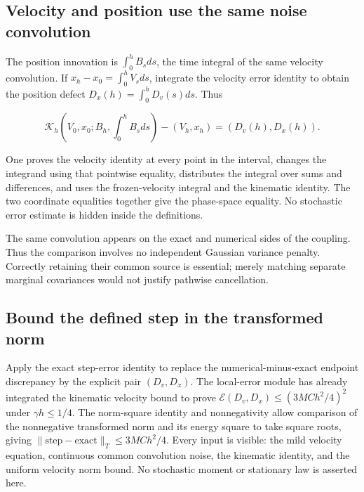 \documentclass[11pt,a4paper]{report}
\begin{document}
\subsection{\texorpdfstring{Velocity and position use the same noise convolution}{Velocity and position use the same noise convolution}}
\label{report-step-KineticLangevin-MildError-lean-3}


The position innovation is \(\int_0^h B_sds\), the time integral of the same velocity convolution. If \(x_h-x_0=\int_0^hV_sds\), integrate the velocity error identity to obtain the position defect \(D_x(h)=\int_0^hD_v(s)ds\). Thus

\[\mathcal K_h(V_0,x_0;B_h,\int_0^hB_sds)-(V_h,x_h)=(D_v(h),D_x(h)).\]

One proves the velocity identity at every point in the interval, changes the integrand using that pointwise equality, distributes the integral over sums and differences, and uses the frozen-velocity integral and the kinematic identity. The two coordinate equalities together give the phase-space equality. No stochastic error estimate is hidden inside the definitions.



The same convolution appears on the exact and numerical sides of the coupling. Thus the comparison involves no independent Gaussian variance penalty. Correctly retaining their common source is essential; merely matching separate marginal covariances would not justify pathwise cancellation.

\subsection{\texorpdfstring{Bound the defined step in the transformed norm}{Bound the defined step in the transformed norm}}
\label{report-step-KineticLangevin-MildError-lean-4}


Apply the exact step-error identity to replace the numerical-minus-exact endpoint discrepancy by the explicit pair \((D_v,D_x)\). The local-error module has already integrated the kinematic velocity bound to prove \(\mathcal E(D_v,D_x)\le(3MC h^2/4)^2\) under \(\gamma h\le1/4\). The norm-square identity and nonnegativity allow comparison of the nonnegative transformed norm and its energy square to take square roots, giving \(\|\text{step}-\text{exact}\|_T\le3MC h^2/4\). Every input is visible: the mild velocity equation, continuous common convolution noise, the kinematic identity, and the uniform velocity norm bound. No stochastic moment or stationary law is asserted here.
\end{document}
